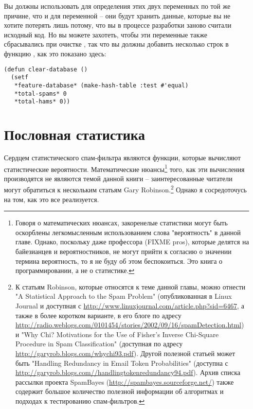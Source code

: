 Вы должны использовать  для определения этих двух переменных по той же
причине, что и для переменной  -- они будут хранить данные,
которые вы не хотите потерять лишь потому, что вы в процессе разработки заново считали
исходный код.  Но вы можете захотеть, чтобы эти переменные также сбрасывались при очистке
, так что вы должны добавить несколько строк в функцию
, как это показано здесь:

\begin{lstlisting}
(defun clear-database ()
  (setf
   *feature-database* (make-hash-table :test #'equal)
   *total-spams* 0
   *total-hams* 0))
\end{lstlisting}

\section{Пословная статистика}

Сердцем статистического спам-фильтра являются функции, которые вычисляют статистические
вероятности.  Математические нюансы\footnote{Говоря о математических нюансах, закоренелые
  статистики могут быть оскорблены легкомысленным использованием слова "вероятность" в
  данной главе.  Однако, поскольку даже профессора (FIXME pros), которые делятся на
  байезианцев и вероятностников, не могут прийти к согласию о значении термина
  вероятность, то я не буду об этом беспокоиться.  Это книга о программировании, а не о
  статистике.} того, как эти вычисления производятся не являются темой данной книги --
заинтересованные читатели могут обратиться к нескольким статьям Gary Robinson.\footnote{К
  статьям Robinson, которые относятся к теме данной главы, можно отнести "A Statistical
  Approach to the Spam Problem" (опубликованная в Linux Journal и доступная с
  \url{http://www.linuxjournal.com/article.php?sid=6467}, а также в более коротком
  варианте, в его блоге по адресу
  \url{http://radio.weblogs.com/0101454/stories/2002/09/16/spamDetection.html}) и "Why
  Chi?  Motivations for the Use of Fisher's Inverse Chi-Square Procedure in Spam
  Classification" (доступная по адресу \url{http://garyrob.blogs.com/whychi93.pdf}).
  Другой полезной статьей может быть "Handling Redundancy in Email Token Probabilities"
  (доступна с \url{http://garyrob.blogs.com//handlingtokenredundancy94.pdf}).  Архив
  списка рассылки проекта SpamBayes (\url{http://spambayes.sourceforge.net/}) также
  содержит большое количество полезной информации об алгоритмах и подходах к тестированию
  спам-фильтров.}  Однако я сосредоточусь на том, как это все реализуется.


